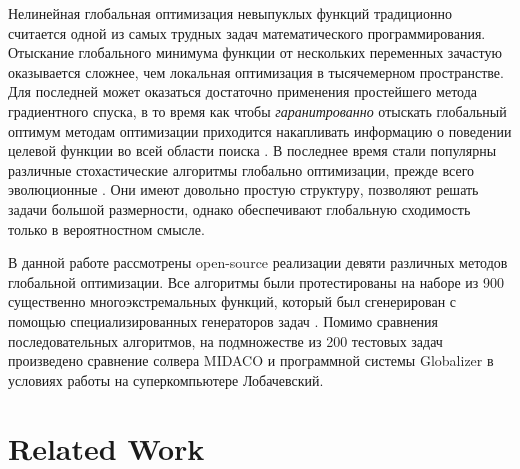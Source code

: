 \documentclass{svproc}
\begin{document}
\begin{Russian}
Нелинейная глобальная оптимизация невыпуклых функций традиционно считается одной из самых трудных
задач математического программирования. Отыскание глобального минимума функции от нескольких переменных
зачастую оказывается сложнее, чем локальная оптимизация в тысячемерном пространстве. Для последней может оказаться достаточно
применения простейшего метода градиентного спуска, в то время как чтобы \textit{гаранитрованно} отыскать глобальный оптимум методам
оптимизации приходится накапливать информацию о поведении целевой функции во всей области поиска \cite{Jones2009,Paulavicius2011,Evtushenko2013,strSergGO}. В последнее время стали популярны
различные стохастические алгоритмы глобально оптимизации, прежде всего эволюционные \cite{Storn1997, SCHLUTER2009, KennedyEberhart1995}. Они имеют довольно простую структуру, позволяют решать задачи большой размерности, однако обеспечивают глобальную сходимость только в вероятностном смысле.

В данной работе рассмотрены open-source реализации девяти различных методов глобальной оптимизации.
Все алгоритмы были протестированы на наборе из 900 существенно многоэкстремальных функций, который был сгенерирован с
помощью специализированных генераторов задач \cite{Gaviano2003, grishaginClass}. Помимо сравнения последовательных алгоритмов, на подмножестве из 200 тестовых задач произведено сравнение солвера MIDACO \cite{Schlueter2012} и программной системы Globalizer \cite{globalizerSystem,Strongin2018} в условиях работы на суперкомпьютере Лобачевский.
\end{Russian}

\section{Related Work}
\end{document}
